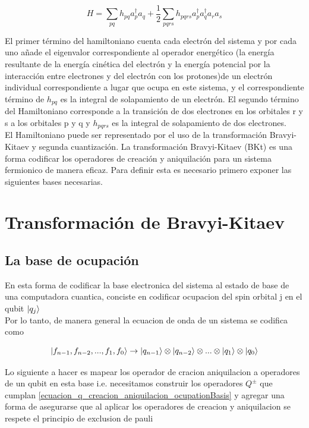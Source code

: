 \documentclass[12pt, oneside]{article}
\begin{document}
\begin{equation}
    H=\sum_{pq}h_{pq}a^{\dagger}_{p}a_q+\frac{1}{2}\sum_{pqrs}h_{pqrs}a^{\dagger}_{p}a_{q}^{\dagger}a_{r}a_s
\end{equation}

El primer término del hamiltoniano cuenta cada electrón del sistema y por cada uno añade el eigenvalor correspondiente al operador energético (la energía resultante de la energía cinética del electrón y la energía potencial por la interacción entre electrones y del electrón con los protones)de un electrón individual correspondiente a lugar que ocupa en este sistema, y el correspondiente término de $h_{pq}$ es la integral de solapamiento de un electrón. El segundo término del Hamiltoniano corresponde a la transición de dos electrones en los orbitales r y s a los orbitales p y q y $h_{pqrs}$ es la integral de solapamiento de dos electrones\cite{zhang2022quantum}. \\

El Hamiltoniano puede ser representado por el uso de la transformación Bravyi-Kitaev y segunda cuantización. La transformación Bravyi-Kitaev (BKt) es una forma codificar los operadores de creación y aniquilación para un sistema fermionico de manera eficaz. Para definir esta es necesario primero exponer las siguientes bases necesarias.

\section{Transformación de Bravyi-Kitaev}

\subsection{La base de ocupación }

En esta forma de codificar la base electronica del sistema al estado de base de una computadora cuantica, conciste en codificar ocupacion del spin orbital j en el qubit $\ket{q_j}$\\

Por lo tanto,  de manera general la ecuacion de onda de un sistema se codifica como

\begin{equation}
    \ket{f_{n-1},f_{n-2},...,f_1,f_0}\rightarrow\ket{q_{n-1}}\otimes\ket{q_{n-2}}\otimes...\otimes\ket{q_{1}}\otimes \ket{q_0}
\end{equation}

Lo siguiente a hacer es mapear los operador de cracion aniquilacion a operadores de un qubit en esta base i.e. necesitamos construir los operadores $Q^{\pm}$ que cumplan \ref{ecuacion_q_creacion_aniquilacion_ocupationBasis} y agregar una forma de asegurarse que al aplicar los operadores de creacion y aniquilacion se respete el principio de exclusion de pauli
\end{document}
